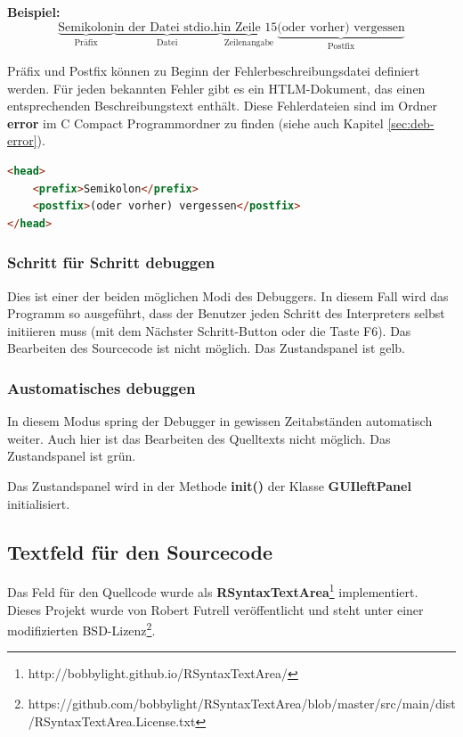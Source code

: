 \textbf{Beispiel:}
\[
\underbrace{\text{Semikolon}}_{\text{Präfix}} \underbrace{\text{in der Datei stdio.h}}_{\text{Datei}} \underbrace{\text{in Zeile 15}}_{\text{Zeilenangabe}} \underbrace{\text{(oder vorher) vergessen}}_{\text{Postfix}}
\]

Präfix und Postfix können zu Beginn der Fehlerbeschreibungsdatei definiert werden. Für jeden bekannten Fehler gibt es ein HTLM-Dokument, das einen entsprechenden Beschreibungstext enthält. Diese Fehlerdateien sind im Ordner \textbf{error} im C Compact Programmordner zu finden (siehe auch Kapitel \ref{sec:deb-error}).

\begin{lstlisting}[language=HTML]
<head>
	<prefix>Semikolon</prefix>
	<postfix>(oder vorher) vergessen</postfix>
</head>
\end{lstlisting}

\subsubsection*{Schritt für Schritt debuggen} Dies ist einer der beiden möglichen Modi des Debuggers. In diesem Fall wird das Programm so ausgeführt, dass der Benutzer jeden Schritt des Interpreters selbst initiieren muss (mit dem \glqq{}Nächster Schritt\grqq{}-Button oder die Taste F6). Das Bearbeiten des Sourcecode ist nicht möglich. Das Zustandspanel ist gelb.

\subsubsection*{Austomatisches debuggen} In diesem Modus spring der Debugger  in gewissen Zeitabständen automatisch weiter. Auch hier ist das Bearbeiten des Quelltexts nicht möglich. Das Zustandspanel ist grün.

Das Zustandspanel wird in der Methode \textbf{init()} der Klasse \textbf{GUIleftPanel} initialisiert.

\subsection{Textfeld für den Sourcecode}
\label{sec:gui-main-left-code}
Das Feld für den Quellcode wurde als \textbf{RSyntaxTextArea}\footnote{http://bobbylight.github.io/RSyntaxTextArea/} implementiert. Dieses Projekt wurde von Robert Futrell veröffentlicht und steht unter einer modifizierten BSD-Lizenz\footnote{https://github.com/bobbylight/RSyntaxTextArea/blob/master/src/main/dist/RSyntaxTextArea.License.txt}.

